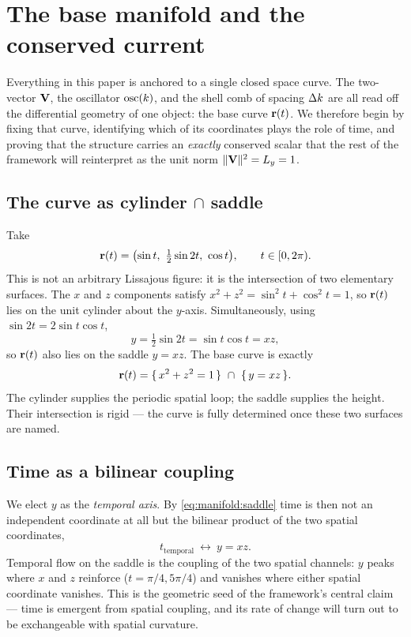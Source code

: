 \section{The base manifold and the conserved current}\label{sec:manifold}

Everything in this paper is anchored to a single closed space curve. The two-vector $\mathbf{V}$, the oscillator $\operatorname{osc}(k)$, and the shell comb of spacing $\Delta k$ are all read off the differential geometry of one object: the base curve $\mathbf{r}(t)$. We therefore begin by fixing that curve, identifying which of its coordinates plays the role of time, and proving that the structure carries an \emph{exactly} conserved scalar that the rest of the framework will reinterpret as the unit norm $\|\mathbf{V}\|^{2}=L_{y}=1$.

\subsection{The curve as cylinder $\cap$ saddle}

Take
\begin{equation}
\rr(t)=\bigl(\sin t,\ \tfrac{1}{2}\sin 2t,\ \cos t\bigr),
\qquad t\in[0,2\pi).
\label{eq:manifold:curve}
\end{equation}
This is not an arbitrary Lissajous figure: it is the intersection of two elementary surfaces. The $x$ and $z$ components satisfy $x^{2}+z^{2}=\sin^{2}t+\cos^{2}t=1$, so $\mathbf{r}(t)$ lies on the unit cylinder about the $y$-axis. Simultaneously, using $\sin 2t=2\sin t\cos t$,
\begin{equation}
y=\tfrac{1}{2}\sin 2t=\sin t\cos t=xz,
\label{eq:manifold:saddle}
\end{equation}
so $\mathbf{r}(t)$ also lies on the saddle $y=xz$. The base curve is exactly
\begin{equation}
\mathbf{r}(t)=\{\,x^{2}+z^{2}=1\,\}\ \cap\ \{\,y=xz\,\}.
\label{eq:manifold:intersection}
\end{equation}
The cylinder supplies the periodic spatial loop; the saddle supplies the height. Their intersection is rigid — the curve is fully determined once these two surfaces are named.

\subsection{Time as a bilinear coupling}

We elect $y$ as the \emph{temporal axis}. By \eqref{eq:manifold:saddle} time is then not an independent coordinate at all but the bilinear product of the two spatial coordinates,
\begin{equation}
t_{\mathrm{temporal}}\ \longleftrightarrow\ y=xz.
\label{eq:manifold:time}
\end{equation}
Temporal flow on the saddle is the coupling of the two spatial channels: $y$ peaks where $x$ and $z$ reinforce ($t=\pi/4,5\pi/4$) and vanishes where either spatial coordinate vanishes. This is the geometric seed of the framework's central claim — time is emergent from spatial coupling, and its rate of change will turn out to be exchangeable with spatial curvature.

